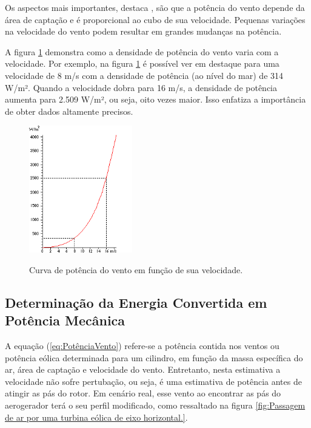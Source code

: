         \par Os aspectos mais importantes, destaca , são que a potência do vento depende da área de captação e é proporcional ao cubo de sua velocidade. Pequenas variações na velocidade do vento podem resultar em grandes mudanças na potência.

        \par A figura \ref{fig:CuboVelocidadeVento} demonstra como a densidade de potência do vento varia com a velocidade. Por exemplo, na figura \ref{fig:CuboVelocidadeVento} é possível ver em destaque para uma velocidade de 8 m/s com a densidade de potência (ao nível do mar) de 314 W/m². Quando a velocidade dobra para 16 m/s, a densidade de potência aumenta para 2.509 W/m², ou seja, oito vezes maior. Isso enfatiza a importância de obter dados altamente precisos.

        \begin{figure}[h!]
            \centering
            \caption{Curva de potência do vento em função de sua velocidade.}
            \includegraphics[width=0.4\textwidth, height=0.4\textwidth]{Figuras/Teorico/Cubo de Velocidade do Vento.png}
            \label{fig:CuboVelocidadeVento}
        \end{figure}

    \subsection{Determinação da Energia Convertida em Potência Mecânica}
    \par A equação (\ref{eq:PotênciaVento}) refere-se a potência contida nos ventos ou potência eólica determinada para um cilindro, em função da massa específica do ar, área de captação e velocidade do vento. Entretanto, nesta estimativa a velocidade não sofre pertubação, ou seja, é uma estimativa de potência antes de atingir as pás do rotor. Em cenário real, esse vento ao encontrar as pás do aerogerador terá o seu perfil modificado, como ressaltado na figura \ref{fig:Passagem de ar por uma turbina eólica de eixo horizontal.}.

